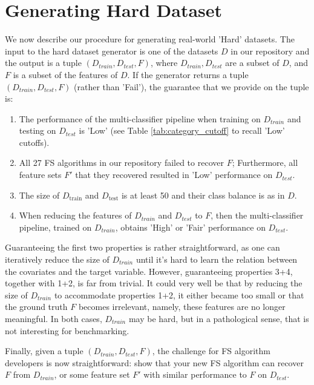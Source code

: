 \documentclass[preprint,12pt,authoryear]{elsarticle}
\begin{document}
\section{Generating Hard Dataset}\label{sec:peeling}
We now describe our procedure for generating real-world 'Hard' datasets.
The input to the hard dataset generator is one of the datasets $D$ in our repository and the output is a tuple $(D_{train},D_{test},F)$, where $D_{train},D_{test}$ are a subset of $D$, and $F$ is a subset of the features of $D$. If the generator returns a tuple $(D_{train},D_{test},F)$ (rather than 'Fail'), the guarantee that we provide on the tuple is:
\begin{enumerate}
    \item  The performance of the multi-classifier pipeline when training on $D_{train}$ and testing on $D_{test}$ is 'Low' (see Table \ref{tab:category_cutoff} to recall 'Low' cutoffs).
    \item All 27 FS algorithms in our repository failed to recover $F$; Furthermore, all feature sets $F'$ that they recovered resulted in 'Low' performance on $D_{test}$.
    \item The size of $D_{\text{train}}$ and $D_{\text{test}}$ is at least 50 and their class balance is as in $D$.
    \item When reducing the features of $D_{train}$ and $D_{test}$ to $F$, then the multi-classifier pipeline, trained on $D_{train}$, obtains 'High' or 'Fair' performance on $D_{test}$.

\end{enumerate}


Guaranteeing the first two properties is rather straightforward, as one can iteratively reduce the size of $D_{train}$ until it's hard to learn the relation between the covariates and the target variable. However, guaranteeing properties 3+4, together with 1+2, is far from trivial. It could very well be that by reducing the size of $D_{train}$ to accommodate properties 1+2, it either became too small or that the ground truth $F$ becomes irrelevant, namely, these features are no longer meaningful. In both cases, $D_{train}$ may be hard, but in a pathological sense, that is not interesting for benchmarking.   

Finally, given a tuple $(D_{train},D_{test},F)$, the challenge for FS algorithm developers is now straightforward: show that your new FS algorithm can recover $F$ from $D_{train}$, or some feature set $F'$ with similar performance to $F$ on $D_{test}$. 
\end{document}
